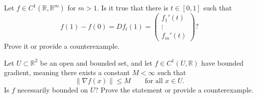 

\begin{exercise}
\label{ex:mean_value_vector_valued}
Let $f \in C^1(\mathbb{R},\mathbb{R}^m)$ for $m > 1$. Is it true that there is $t \in [0,1]$ such
that
$$f(1) - f(0) = Df_t(1) = \begin{pmatrix} f_1'(t) \\ \vdots \\ f_m'(t) \end{pmatrix}?$$
Prove it or provide a counterexample.

\end{exercise}

\begin{exercise}
\label{ex:bounded_gradient_unbounded_function}
Let $U \subset \mathbb{R}^2$ be an open and bounded set, and let $f \in C^1(U, \mathbb{R})$ have
bounded gradient, meaning there exists a constant $M < \infty$ such that
\[
\|\nabla f(x)\| \leq M \qquad \text{for all } x \in U.
\]
Is $f$ necessarily bounded on $U$? Prove the statement or provide a counterexample.
\end{exercise}
